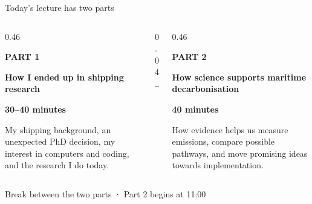\documentclass[aspectratio=169,11pt]{beamer}
\newcommand{\eyebrow}[1]{%
  {\color{Orange}\fontsize{9}{11}\selectfont\bfseries\MakeUppercase{#1}\par}
}
\begin{document}
\begin{frame}{Today’s lecture has two parts}
  \vspace{0.1cm}

  \begin{columns}[T,onlytextwidth]
    \begin{column}{0.46\textwidth}
      \eyebrow{Part 1}
      \vspace{0.16cm}
      {\color{Navy}\fontsize{16}{19}\selectfont\bfseries
        How I ended up in shipping research
      \par}
      \vspace{0.12cm}
      {\color{Orange}\fontsize{10.5}{13}\selectfont\bfseries 30–40 minutes\par}
      \vspace{0.22cm}
      {\color{Muted}\fontsize{11.5}{16}\selectfont
        My shipping background, an unexpected PhD decision, my interest in
        computers and coding, and the research I do today.
      \par}
    \end{column}

    \begin{column}{0.04\textwidth}
      \centering
      {\color{Pale}\rule{1pt}{3.45cm}}
    \end{column}

    \begin{column}{0.46\textwidth}
      \eyebrow{Part 2}
      \vspace{0.16cm}
      {\color{Navy}\fontsize{16}{19}\selectfont\bfseries
        How science supports maritime decarbonisation
      \par}
      \vspace{0.12cm}
      {\color{Orange}\fontsize{10.5}{13}\selectfont\bfseries 40 minutes\par}
      \vspace{0.22cm}
      {\color{Muted}\fontsize{11.5}{16}\selectfont
        How evidence helps us measure emissions, compare possible pathways,
        and move promising ideas towards implementation.
      \par}
    \end{column}
  \end{columns}

  \vfill
  {\color{Quiet}\fontsize{8.5}{11}\selectfont
    Break between the two parts · Part 2 begins at 11:00
  \par}
\end{frame}
\end{document}
